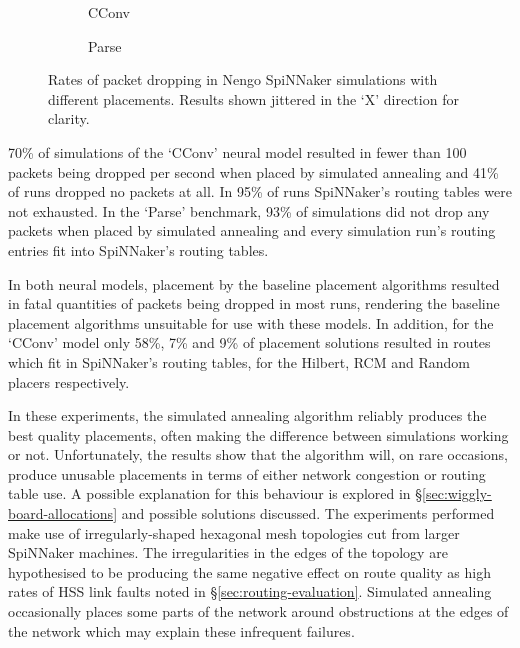 				\begin{figure}
					\center
					\begin{subfigure}{0.45\linewidth}
						
						\caption{CConv}
						\label{fig:cconv-dropped-packets}
					\end{subfigure}
					\begin{subfigure}{0.45\linewidth}
						
						\caption{Parse}
						\label{fig:parse-dropped-packets}
					\end{subfigure}
					
					\caption[Packet dropping in Nengo SpiNNaker simulations]%
					{Rates of packet dropping in Nengo SpiNNaker simulations
					with different placements. Results shown jittered in the `X'
					direction for clarity.}
					\label{fig:nengo-dropped-packets}
				\end{figure}
				
				70\% of simulations of the `CConv' neural model resulted in fewer than
				100 packets being dropped per second when placed by simulated annealing
				and 41\% of runs dropped no packets at all. In 95\% of runs SpiNNaker's
				routing tables were not exhausted. In the `Parse' benchmark, 93\% of
				simulations did not drop any packets when placed by simulated annealing
				and every simulation run's routing entries fit into SpiNNaker's routing
				tables.
				
				In both neural models, placement by the baseline placement algorithms
				resulted in fatal quantities of packets being dropped in most runs,
				rendering the baseline placement algorithms unsuitable for use with
				these models. In addition, for the `CConv' model only 58\%, 7\% and 9\%
				of placement solutions resulted in routes which fit in SpiNNaker's
				routing tables, for the Hilbert, RCM and Random placers respectively.
				
				In these experiments, the simulated annealing algorithm reliably
				produces the best quality placements, often making the difference
				between simulations working or not. Unfortunately, the results show
				that the algorithm will, on rare occasions, produce unusable placements
				in terms of either network congestion or routing table use. A possible
				explanation for this behaviour is explored in
				\S\ref{sec:wiggly-board-allocations} and possible solutions discussed.
				The experiments performed make use of irregularly-shaped hexagonal mesh
				topologies cut from larger SpiNNaker machines. The irregularities in
				the edges of the topology are hypothesised to be producing the same
				negative effect on route quality as high rates of HSS link faults noted
				in \S\ref{sec:routing-evaluation}. Simulated annealing occasionally
				places some parts of the network around obstructions at the edges of
				the network which may explain these infrequent failures.
				
